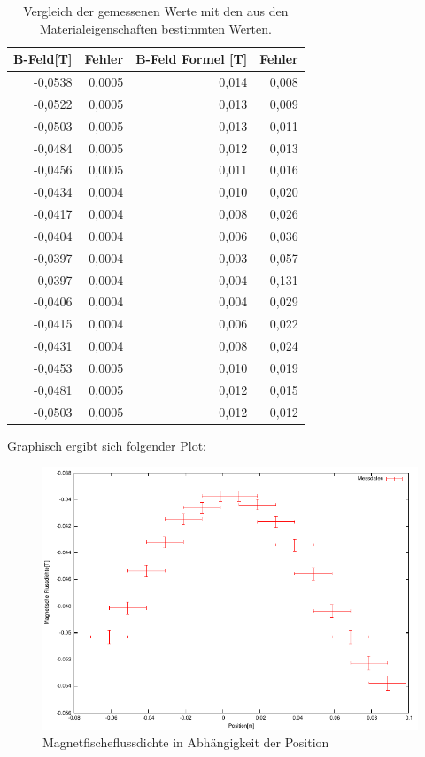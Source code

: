 \documentclass[12pt]{scrartcl}
\begin{document}
\begin{table}[htbp]
\caption{Vergleich der gemessenen Werte mit den aus den Materialeigenschaften bestimmten Werten.}
\begin{center}
\begin{tabular}{|r|r|r|r|}
\hline
\multicolumn{1}{|l|}{B-Feld[T]} & Fehler & \multicolumn{1}{l|}{B-Feld Formel [T]} & \multicolumn{1}{l|}{Fehler} \\ \hline
-0,0538 & 0,0005 & 0,014 & 0,008 \\ \hline
-0,0522 & 0,0005 & 0,013 & 0,009 \\ \hline
-0,0503 & 0,0005 & 0,013 & 0,011 \\ \hline
-0,0484 & 0,0005 & 0,012 & 0,013 \\ \hline
-0,0456 & 0,0005 & 0,011 & 0,016 \\ \hline
-0,0434 & 0,0004 & 0,010 & 0,020 \\ \hline
-0,0417 & 0,0004 & 0,008 & 0,026 \\ \hline
-0,0404 & 0,0004 & 0,006 & 0,036 \\ \hline
-0,0397 & 0,0004 & 0,003 & 0,057 \\ \hline
-0,0397 & 0,0004 & 0,004 & 0,131 \\ \hline
-0,0406 & 0,0004 & 0,004 & 0,029 \\ \hline
-0,0415 & 0,0004 & 0,006 & 0,022 \\ \hline
-0,0431 & 0,0004 & 0,008 & 0,024 \\ \hline
-0,0453 & 0,0005 & 0,010 & 0,019 \\ \hline
-0,0481 & 0,0005 & 0,012 & 0,015 \\ \hline
-0,0503 & 0,0005 & 0,012 & 0,012 \\ \hline
\end{tabular}
\end{center}
\label{aufgabe_4}
\end{table}

\newpage

Graphisch ergibt sich folgender Plot:

\begin{figure}[htbp] 
  \centering
    \includegraphics[scale = 1.3]{aufgabe_4.pdf}
  	\caption[Magnetfischerfluss in Abhängigkeit der Position]{Magnetfischeflussdichte in Abhängigkeit der Position}
  \label{fig:fluss_pos}
\end{figure}
\end{document}
